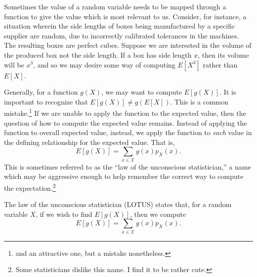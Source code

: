 \documentclass[
  letterpaper,
  DIV=11,
  numbers=noendperiod]{scrreprt}
\theoremstyle{definition}
\theoremstyle{definition}
\theoremstyle{definition}
\theoremstyle{remark}
\begin{document}
Sometimes the value of a random variable needs to be mapped through a
function to give the value which is most relevant to us. Consider, for
instance, a situation wherein the side lengths of boxes being
manufactured by a specific supplier are random, due to incorrectly
calibrated tolerances in the machines. The resulting boxes are perfect
cubes. Suppose we are interested in the volume of the produced box not
the side length. If a box has side length \(x\), then its volume will be
\(x^3\), and so we may desire some way of computing \(E[X^3]\) rather
than \(E[X]\).

Generally, for a function \(g(X)\), we may want to compute \(E[g(X)]\).
It is important to recognize that \(E[g(X)] \neq g(E[X])\). This is a
common mistake.\footnote{and an attractive one, but a mistake
  nonetheless.} If we are unable to apply the function to the expected
value, then the question of how to compute the expected value remains.
Instead of applying the function to overall expected value, instead, we
apply the function to \emph{each} value in the defining relationship for
the expected value. That is,
\[E[g(X)] = \sum_{x\in\mathcal{X}} g(x)p_X(x).\] This is sometimes
referred to as the ``law of the unconscious statistician,'' a name which
may be aggressive enough to help remember the correct way to compute the
expectation.\footnote{Some statisticians dislike this name. I find it to
  be rather cute.}

\begin{tcolorbox}[enhanced jigsaw, coltitle=black, colframe=quarto-callout-tip-color-frame, colbacktitle=quarto-callout-tip-color!10!white, bottomrule=.15mm, opacitybacktitle=0.6, colback=white, toptitle=1mm, arc=.35mm, leftrule=.75mm, bottomtitle=1mm, opacityback=0, breakable, rightrule=.15mm, title={The Law of the Unconscious Statistician}, left=2mm, titlerule=0mm, toprule=.15mm]

The law of the unconscious statistician (LOTUS) states that, for a
random variable \(X\), if we wish to find \(E[g(X)]\), then we compute
\[E[g(X)] = \sum_{x\in\mathcal{X}} g(x)p_X(x).\]

\end{tcolorbox}
\end{document}
